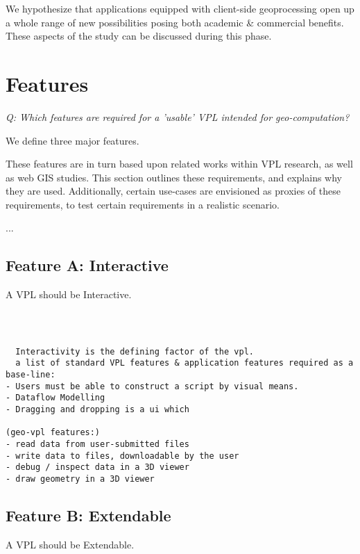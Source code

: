 We hypothesize that applications equipped with client-side geoprocessing open up a whole range of new possibilities posing both academic \& commercial benefits. 
These aspects of the study can be discussed during this phase. 




\section*{Features}

\emph{Q: Which features are required for a 'usable' VPL intended for geo-computation?}

We define three major features.  

These features are in turn based upon related works within VPL research, as well as web GIS studies. 
This section outlines these requirements, and explains why they are used. 
Additionally, certain use-cases are envisioned as proxies of these requirements, to test certain requirements in a realistic scenario. 

...

\subsection*{Feature A: Interactive}

A VPL should be Interactive.

\begin{lstlisting}



  Interactivity is the defining factor of the vpl. 
  a list of standard VPL features & application features required as a base-line:  
- Users must be able to construct a script by visual means.
- Dataflow Modelling
- Dragging and dropping is a ui which

(geo-vpl features:)
- read data from user-submitted files
- write data to files, downloadable by the user  
- debug / inspect data in a 3D viewer
- draw geometry in a 3D viewer

\end{lstlisting}





\subsection*{Feature B: Extendable}

A VPL should be Extendable. 

